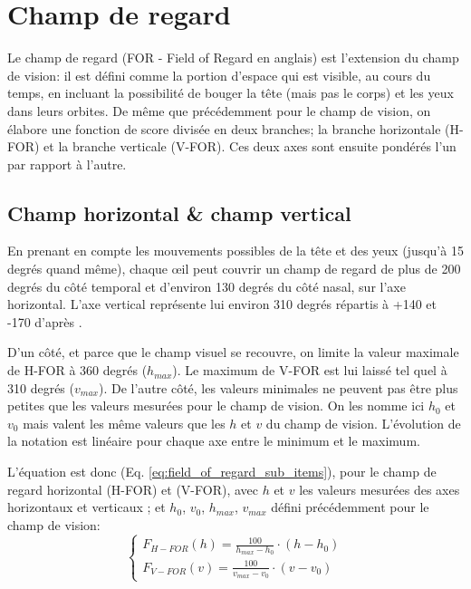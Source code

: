 	\section{Champ de regard}
	\par Le champ de regard (FOR - Field of Regard en anglais) est l'extension du champ de vision: il est défini comme la portion d'espace qui est visible, au cours du temps, en incluant la possibilité de bouger la tête (mais pas le corps) et les yeux dans leurs orbites. De même que précédemment pour le champ de vision, on élabore une fonction de score divisée en deux branches; la branche horizontale (H-FOR) et la branche verticale (V-FOR). Ces deux axes sont ensuite pondérés l'un par rapport à l'autre.
	
	\subsection{Champ horizontal \& champ vertical}
	\par En prenant en compte les mouvements possibles de la tête et des yeux (jusqu'à 15 degrés quand même), chaque œil peut couvrir un champ de regard de plus de 200 degrés du côté temporal et d'environ 130 degrés du côté nasal, sur l'axe horizontal. L'axe vertical représente lui environ 310 degrés répartis à +140 et -170 d'après \citep{fuchs_traite_2003}.
	
	\par D'un côté, et parce que le champ visuel se recouvre, on limite la valeur maximale de H-FOR à 360 degrés ($h_{max}$). Le maximum de V-FOR est lui laissé tel quel à 310 degrés ($v_{max}$). De l'autre côté, les valeurs minimales ne peuvent pas être plus petites que les valeurs mesurées pour le champ de vision. On les nomme ici $h_0$ et $v_0$ mais valent les même valeurs que les $h$ et $v$ du champ de vision. L'évolution de la notation est linéaire pour chaque axe entre le minimum et le maximum.
	
	\par L'équation est donc (Eq. \ref{eq:field_of_regard_sub_items}), pour le champ de regard horizontal (H-FOR) et (V-FOR), avec $h$ et $v$ les valeurs mesurées des axes horizontaux et verticaux ; et $h_{0}$, $v_{0}$, $h_{max}$, $v_{max}$ défini précédemment pour le champ de vision:
	\begin{equation}
	\begin{cases}
		F_{H-FOR}(h) = \frac{100}{h_{max} - h_0} \cdot (h - h_0)\\
		F_{V-FOR}(v) = \frac{100}{v_{max} - v_0} \cdot (v - v_0)
	\end{cases}
	\label{eq:field_of_regard_sub_items}
	\end{equation}
	
